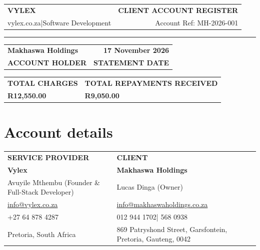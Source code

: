 \documentclass[11pt,a4paper]{article}
\newcommand{\money}[1]{\mbox{R#1}}
\newcommand{\brandrule}{\par{\color{orange}\rule{\textwidth}{1.5pt}}\par}
\newcommand{\labeltext}[1]{{\footnotesize\bfseries\color{muted}#1}}
\begin{document}
\begin{tabularx}{\textwidth}{@{}L r@{}}
{\fontsize{25}{29}\selectfont\bfseries\color{navy}VYLEX}
& {\large\bfseries\color{navy}CLIENT ACCOUNT REGISTER}\\
{\small\color{muted}vylex.co.za\enspace|\enspace Software Development}
& {\small Account Ref: MH-2026-001}
\end{tabularx}
\brandrule
\begin{tabularx}{\textwidth}{@{}L r@{}}
\textbf{Makhaswa Holdings} & \textbf{17 November 2026}\\
\labeltext{ACCOUNT HOLDER} & \labeltext{STATEMENT DATE}
\end{tabularx}

\vspace{2pt}
\begingroup
\setlength{\fboxsep}{5pt}
\noindent\colorbox{pale}{\parbox{\dimexpr\textwidth-2\fboxsep\relax}{%
\begin{tabularx}{\linewidth}{@{}L L@{}}
\labeltext{TOTAL CHARGES} & \labeltext{TOTAL REPAYMENTS RECEIVED}\\[5pt]
{\fontsize{20}{23}\selectfont\bfseries\color{navy}\money{12,550.00}}
& {\fontsize{20}{23}\selectfont\bfseries\color{paid}\money{9,050.00}}\\
\end{tabularx}}}
\endgroup

\section*{Account details}
{\small
\begin{tabularx}{\textwidth}{@{}L L@{}}
\textbf{\color{navy}SERVICE PROVIDER} & \textbf{\color{navy}CLIENT}\\
\textbf{Vylex} & \textbf{Makhaswa Holdings}\\
Avuyile Mthembu (Founder \& Full-Stack Developer) & Lucas Dinga (Owner)\\
\href{mailto:info@vylex.co.za}{info@vylex.co.za} & \href{mailto:info@makhaswaholdings.co.za}{info@makhaswaholdings.co.za}\\
+27 64 878 4287 & 012 944 1702\enspace| 568 0938\\
Pretoria, South Africa & 869 Patryshond Street, Garsfontein, Pretoria, Gauteng, 0042
\end{tabularx}}
\end{document}
